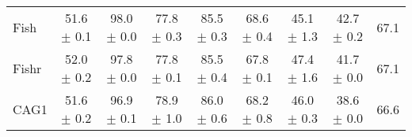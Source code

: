 \documentclass{article}
\begin{document}
\begin{center}
{\begin{tabular}{lcccccccc}
Fish                      & 51.6 $\pm$ 0.1            & 98.0 $\pm$ 0.0            & 77.8 $\pm$ 0.3            & 85.5 $\pm$ 0.3            & 68.6 $\pm$ 0.4            & 45.1 $\pm$ 1.3            & 42.7 $\pm$ 0.2            & 67.1                      \\
Fishr                     & 52.0 $\pm$ 0.2            & 97.8 $\pm$ 0.0            & 77.8 $\pm$ 0.1            & 85.5 $\pm$ 0.4            & 67.8 $\pm$ 0.1            & 47.4 $\pm$ 1.6            & 41.7 $\pm$ 0.0            & 67.1                      \\
\midrule
CAG1                      & 51.6 $\pm$ 0.2            & 96.9 $\pm$ 0.1            & 78.9 $\pm$ 1.0            & 86.0 $\pm$ 0.6            & 68.2 $\pm$ 0.8            & 46.0 $\pm$ 0.3            & 38.6 $\pm$ 0.0            & 66.6                      \\
\bottomrule
\end{tabular}}
\end{center}
\end{document}
